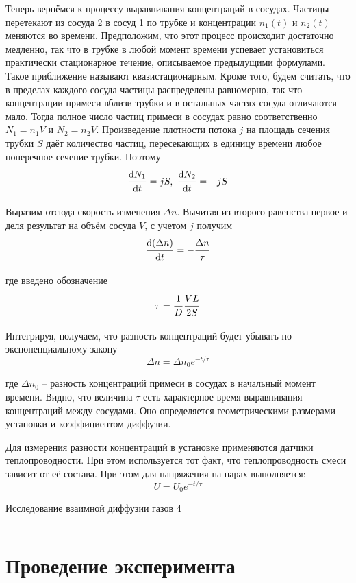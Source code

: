 \documentclass[12pt,a4paper]{scrartcl}
\begin{document}
	Теперь вернёмся к процессу выравнивания концентраций в сосудах.	Частицы перетекают из сосуда 2 в сосуд 1 по трубке и концентрации $n_1(t)$ и $n_2(t)$ меняются во времени. Предположим, что этот процесс происходит достаточно медленно, так что в трубке в любой момент времени успевает установиться практически стационарное течение, описываемое предыдущими формулами. Такое приближение называют квазистационарным. Кроме того, будем считать, что в пределах каждого сосуда частицы распределены равномерно, так что концентрации примеси вблизи трубки и в остальных частях сосуда отличаются мало. Тогда полное число частиц примеси в сосудах равно соответственно $N_1 = n_1V$ и $N_2=n_2V$. Произведение плотности потока $j$ на площадь сечения трубки $S$ даёт количество частиц, пересекающих в единицу времени любое поперечное сечение трубки. Поэтому
	$$\sfrac{\mathrm{d}N_1}{\mathrm{d}t} = jS,\ \sfrac{\mathrm{d}N_2}{\mathrm{d}t} = -jS$$
	
	Выразим отсюда скорость изменения $\Delta n$. Вычитая из второго равенства
	первое и деля результат на объём сосуда $V$, с учетом $j$ получим
	$$\dfrac{\strut \mathrm{d}(\Delta n)}{\strut \mathrm{d}t} = -\dfrac{\strut \Delta n}{\strut \tau}$$
	
	где введено обозначение
	$$\tau = \dfrac{\strut 1}{\strut D}\dfrac{\strut VL}{\strut 2S}$$
	
	Интегрируя, получаем, что разность концентраций будет убывать по экспоненциальному закону
	$$\Delta n = \Delta n_0 e^{-t/\tau}$$
	
	где $\Delta n_0$ -- разность концентраций примеси в сосудах в начальный момент
	времени. Видно, что величина $\tau$ есть характерное время выравнивания концентраций между сосудами. Оно определяется геометрическими размерами установки и коэффициентом диффузии.
	
	Для измерения разности концентраций в установке применяются датчики теплопроводности. При этом используется	тот факт, что теплопроводность смеси зависит от её состава. При этом для напряжения на парах выполняется:
	$$U = U_0 e^{-t/\tau}$$
	
	
	\newpage
	
	\begin{flushleft}
		\footnotesize{Исследование взаимной диффузии газов} \hspace{\fill} \footnotesize{4}
		\\[-0.3cm]\noindent\rule{\textwidth}{0.3pt}
	\end{flushleft}
	
	\section{Проведение эксперимента}
	
\end{document}

